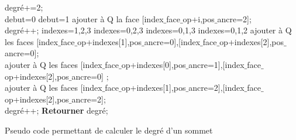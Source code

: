\documentclass[a4paper,11pt,openany]{article}
\begin{document}
\begin{appendices}
\begin{algorithm}[th]
{{{{{        			degré+=2;\\
        		}
        		{
        			{
        				debut=0
        			}
        			{
        				debut=1
        			}
        			{
        				ajouter à Q la face [index$\_$face$\_$op+i,pos$\_$ancre=2];\\
        				degré++;
        			}
        		}
        	}
        	{
        		{
        			indexes={1,2,3}
        		}
        		{
        			indexes={0,2,3}
        		}
        		{
        			indexes={0,1,3}
        		}
        		{
        			indexes={0,1,2}
        		}
        		{
        			ajouter à Q les faces [index$\_$face$\_$op+indexes[1],pos$\_$ancre=0],[index$\_$face$\_$op+indexes[2],pos$\_$ancre=0];\\
        		}
        		{
        			ajouter à Q les faces [index$\_$face$\_$op+indexes[0],pos$\_$ancre=1],[index$\_$face$\_$op+indexes[2],pos$\_$ancre=0] ;\\
        		}
        		{
        		ajouter à Q les faces [index$\_$face$\_$op+indexes[1],pos$\_$ancre=2],[index$\_$face$\_$op+indexes[2],pos$\_$ancre=2];\\
        		}
        		degré++;
        	}
        }
   	}
	\textbf{Retourner} degré;\\
 }
\caption{Pseudo code permettant de calculer le degré d'un sommet}
\end{algorithm}
\end{appendices}
\end{document}
